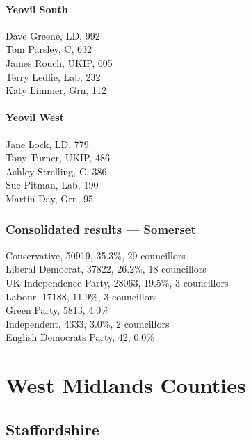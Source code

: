 \documentclass[a4paper,openany,10pt]{book}
\begin{document}
\subsubsection*{Yeovil South}



Dave Greene, LD, 992\\
Tom Parsley, C, 632\\
James Rouch, UKIP, 605\\
Terry Ledlie, Lab, 232\\
Katy Limmer, Grn, 112\\


\subsubsection*{Yeovil West}



Jane Lock, LD, 779\\
Tony Turner, UKIP, 486\\
Ashley Strelling, C, 386\\
Sue Pitman, Lab, 190\\
Martin Day, Grn, 95\\




\subsection*{Consolidated results --- Somerset}
Conservative, 50919, 35.3\%, 29 councillors\\
Liberal Democrat, 37822, 26.2\%, 18 councillors\\
UK Independence Party, 28063, 19.5\%, 3 councillors\\
Labour, 17188, 11.9\%, 3 councillors\\
Green Party, 5813, 4.0\% \\
Independent, 4333, 3.0\%, 2 councillors\\
English Democrats Party, 42, 0.0\% \\


\chapter{West Midlands Counties}

\section{Staffordshire}
\end{document}
